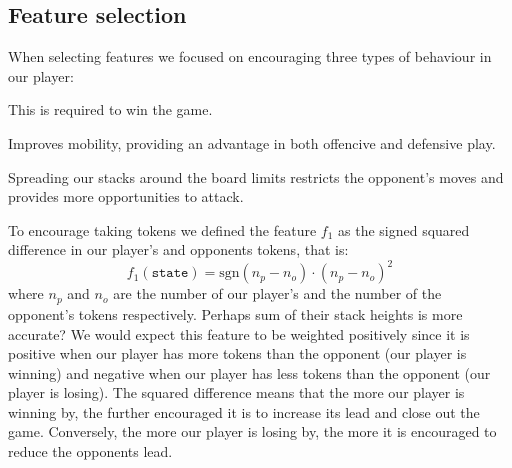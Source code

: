 \documentclass[11pt]{article}
\newcommand{\drafting}[1]{\textcolor{OliveGreen}{#1}}
\begin{document}
\subsection{Feature selection}
When selecting features we focused on encouraging three types of behaviour in our player: 
\begin{description}[labelindent=\parindent]
    \item[Taking tokens:] This is required to win the game.
    \item[Stacking:] Improves mobility, providing an advantage in both offencive and defensive play.
    \item[Controlling space:] Spreading our stacks around the board limits restricts the opponent's moves and provides more opportunities to attack.
\end{description}
To encourage taking tokens we defined the feature $f_1$ as the signed squared difference in our player's and opponents tokens, that is:
\[
    f_1(\texttt{state}) = \textrm{sgn} (n_p - n_o) \cdot (n_p - n_o) ^2
\]
where $n_p$ and $n_o$ are the number of our player's and the number of the opponent's tokens respectively. \drafting{Perhaps sum of their stack heights is more accurate?} We would expect this feature to be weighted positively since it is positive when our player has more tokens than the opponent (our player is winning) and negative when our player has less tokens than the opponent (our player is losing). \drafting{The squared difference means that the more our player is winning by, the further encouraged it is to increase its lead and close out the game. Conversely, the more our player is losing by, the more it is encouraged to reduce the opponents lead.}
\end{document}
